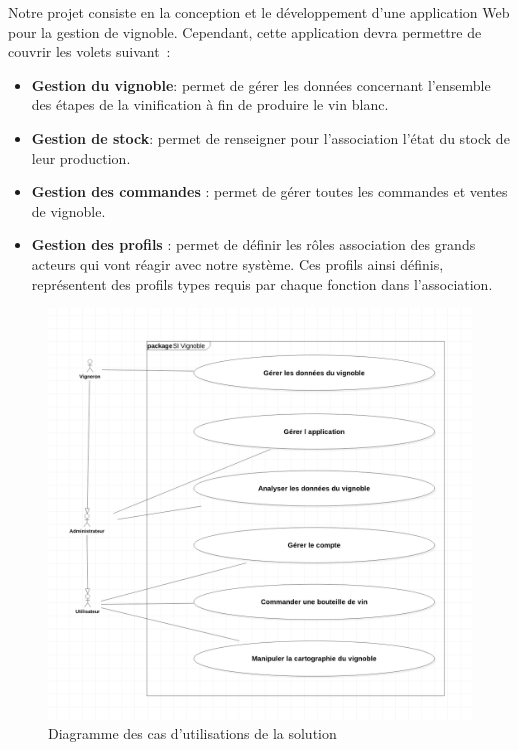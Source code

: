 \documentclass[a4paper, titlepage]{report}
\begin{document}
Notre projet consiste en la conception et le développement d'une
application Web pour la gestion de vignoble. Cependant, cette
application devra permettre de couvrir les volets suivant~: 
\begin{itemize}
\item \textbf{Gestion du vignoble}: permet de gérer les données concernant l'ensemble des étapes
de la vinification à fin de produire le vin blanc.
\item \textbf{Gestion de stock}:
permet de renseigner pour l'association l'état du stock de leur
production.
\item \textbf{Gestion des commandes} : permet de gérer toutes les
commandes et ventes de vignoble.
\item \textbf{Gestion des profils} : permet de
définir les rôles association des grands acteurs qui vont réagir avec
notre système. Ces profils ainsi définis, représentent des profils types
requis par chaque fonction dans l'association.
\end{itemize}

\begin{figure}[!h]
\centering
\includegraphics{Images/UseCaseDiagramSolution.png}
\caption{Diagramme des cas d'utilisations de la solution}
\end{figure}
\end{document}
